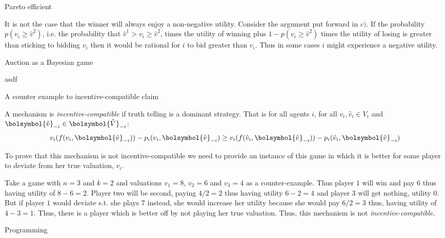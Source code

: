 \documentclass[12pt]{article}
\newenvironment{question}[2][Question]{\begin{trivlist}
\item[\hskip \labelsep {\bfseries #1}\hskip \labelsep {\bfseries #2.}]}{\end{trivlist}}
\newenvironment{answer}[2][Answer]{\begin{trivlist}
\item[\hskip \labelsep {\bfseries #1}\hskip \labelsep {\bfseries #2:}]}{\end{trivlist}}
\begin{document}
\begin{answer}{d)}{Pareto efficient}

It is not the case that the winner will always enjoy a non-negative utility. Consider the argument put forward in $c)$. If the probability $p(v_i\geq\hat{v}^2)$, i.e. the probability that $\hat{v}^1 > v_i \geq \hat{v}^2$, times the utility of winning plus $1-p(v_i\geq\hat{v}^2)$ times the utility of losing is greater than sticking to bidding $v_i$ then it would be rational for $i$ to bid greater than $v_i$. Thus in some cases $i$ might experience a negative utility.
\end{answer}

\begin{question}{2}
Auction as a Bayesian game
\end{question}
\begin{answer}{a)}

asdf
\end{answer}
\begin{question}{3}
A counter example to incentive-compatible claim
\end{question}
\begin{answer}{a)}

A mechanism is \textit{incentive-compatible} if truth telling is a dominant strategy. That is for all agents $i$, for all $v_i, \hat{v}_i \in V_i$ and $\bolsymbol{\hat{v}}_{-i} \in \bolsymbol{\hat{V}}_{-i}$:
$$v_i(f(v_i,\bolsymbol{\hat{v}}_{-i})) - p_i(v_i,\bolsymbol{\hat{v}}_{-i}) \geq v_i(f(\hat{v}_i,\bolsymbol{\hat{v}}_{-i})) - p_i(\hat{v}_i,\bolsymbol{\hat{v}}_{-i})$$

To prove that this mechanism is not incentive-compatible we need to provide an instance of this game in which it is better for some player to deviate from her true valuation, $v_i$.

Take a game with $n=3$ and $k=2$ and valuations $v_1=8$, $v_2=6$ and $v_3=4$ as a counter-example. Thus player $1$ will win and pay $6$ thus having utility of $8-6=2$. Player two will be second, paying $4/2=2$ thus having utility $6-2=4$ and player $3$ will get nothing, utility $0$. But if player $1$ would deviate s.t. she plays $7$ instead, she would increase her utility because she would pay $6/2=3$ thus, having utility of $4-3=1$. Thus, there is a player which is better off by not playing her true valuation. Thus, this mechanism is not \textit{incentive-compatible}.
\end{answer}


\begin{question}{4}
Programming
\end{question}
\begin{answer}{a)}

\end{answer}
\end{document}
